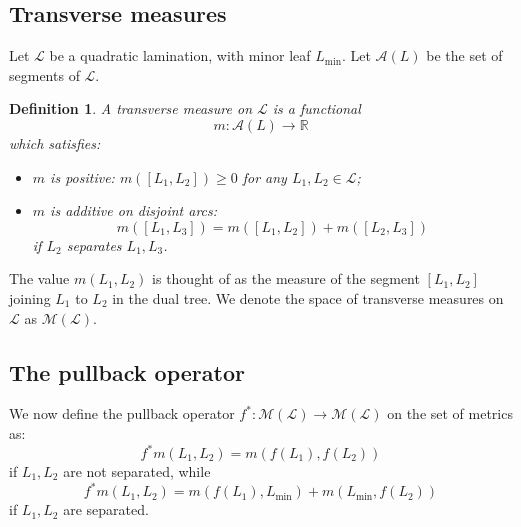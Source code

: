 \documentclass[11pt]{amsart}
\newtheorem{definition}[theorem]{Definition}
\begin{document}
\subsection{Transverse measures}



Let $\mathcal{L}$ be a quadratic lamination, with minor leaf $L_{\min}$. 
Let $\mathcal{A}(L)$ be the set of segments of $\mathcal{L}$. 

\begin{definition}
A \emph{transverse measure} on $\mathcal{L}$   is a functional
$$m : \mathcal{A}(L) \to \mathbb{R}$$  
which satisfies:  
\begin{itemize}
\item[(i)] 
$m$ is \emph{positive}: $m([L_1,L_2]) \geq 0$ for any $L_1, L_2 \in \mathcal{L}$;  
\item[(ii)]
$m$ is \emph{additive} on disjoint arcs: 
$$m([L_1, L_3]) = m([L_1, L_2]) + m([L_2, L_3])$$
if $L_2$ separates $L_1, L_3$.
\end{itemize}
\end{definition}

The value $m(L_1, L_2)$ is thought of as the measure of the segment $[L_1, L_2]$ joining $L_1$ to $L_2$ in the dual tree. 
We denote the space of transverse measures on $\mathcal{L}$ as $\mathcal{M}(\mathcal{L})$.

\subsection{The pullback operator}



We now define the pullback operator $f^* : \mathcal{M}(\mathcal{L}) \to \mathcal{M}(\mathcal{L})$ 
on the set of metrics as: 
$$f^*m(L_1, L_2) = m(f(L_1), f(L_2))$$
if $L_1, L_2$ are not separated, while 
$$f^*m(L_1, L_2) = m(f(L_1), L_{\min}) + m(L_{\min}, f(L_2))$$
if $L_1, L_2$ are separated.
\end{document}
